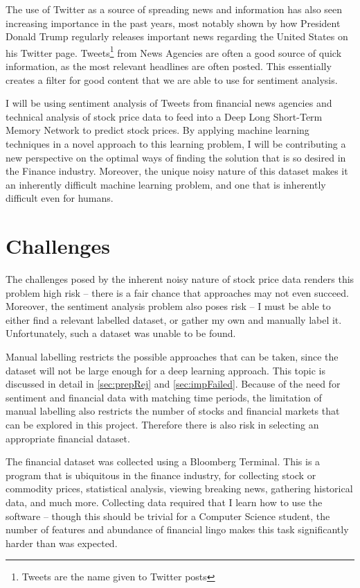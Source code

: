 \documentclass[12pt,a4paper,twoside,openright]{report}
\begin{document}
The use of Twitter as a source of spreading news and information has also seen increasing importance in the past years,
most notably shown by how President Donald Trump regularly releases important news regarding the United States 
on his Twitter page. Tweets\footnote{Tweets are the name given to Twitter posts} from News Agencies are often
a good source of quick information, as the most relevant headlines are often posted. This essentially creates
a filter for good content that we are able to use for sentiment analysis.

I will be using sentiment analysis of Tweets from financial news agencies and technical analysis of stock
price data to feed into a Deep Long Short-Term Memory Network to predict stock prices.
By applying machine learning techniques in a novel approach to this learning problem,
I will be contributing a new perspective on the optimal ways of finding the solution
that is so desired in the Finance industry. Moreover, the unique noisy nature of this
dataset makes it an inherently difficult machine learning problem, and one that is inherently
difficult even for humans.

\section{Challenges}
\label{sec:introChallenges}

The challenges posed by the inherent noisy nature of stock price data renders this problem
high risk -- there is a fair chance that approaches may not even succeed. Moreover, the
sentiment analysis problem also poses risk -- I must be able to either find a relevant labelled dataset,
or gather my own and manually label it. Unfortunately, such a dataset was unable to be found.

Manual labelling restricts the possible approaches that
can be taken, since the dataset will not be large enough for a deep learning approach. This topic
is discussed in detail in \cref{sec:prepRej} and \cref{sec:impFailed}.
Because of the need for sentiment and financial data with matching time periods, the limitation of manual labelling
also restricts the number of stocks and financial markets that can be explored in this project. Therefore there
is also risk in selecting an appropriate financial dataset.

The financial dataset was collected using a Bloomberg Terminal. This is a program that is ubiquitous
in the finance industry, for collecting stock or commodity prices, statistical analysis, viewing breaking news,
gathering historical data, and much more. Collecting data required that I learn how to use the software --
though this should be trivial for a Computer Science student, the number of features and abundance of
financial lingo makes this task significantly harder than was expected.
\end{document}
